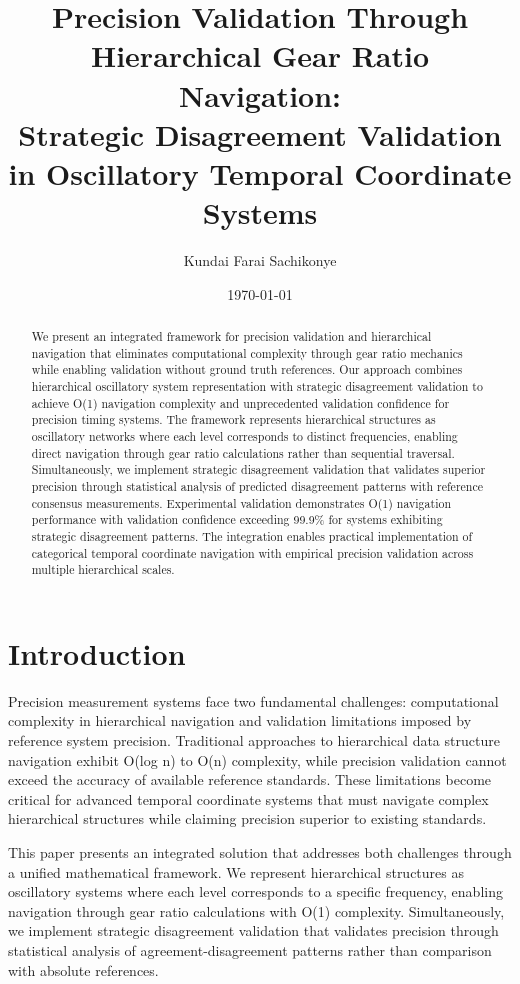 \documentclass[12pt,a4paper]{article}
\title{Precision Validation Through Hierarchical Gear Ratio Navigation: \\
Strategic Disagreement Validation in Oscillatory Temporal Coordinate Systems}
\author{Kundai Farai Sachikonye}
\date{\today}
\begin{document}
\maketitle

\begin{abstract}
We present an integrated framework for precision validation and hierarchical navigation that eliminates computational complexity through gear ratio mechanics while enabling validation without ground truth references. Our approach combines hierarchical oscillatory system representation with strategic disagreement validation to achieve O(1) navigation complexity and unprecedented validation confidence for precision timing systems. The framework represents hierarchical structures as oscillatory networks where each level corresponds to distinct frequencies, enabling direct navigation through gear ratio calculations rather than sequential traversal. Simultaneously, we implement strategic disagreement validation that validates superior precision through statistical analysis of predicted disagreement patterns with reference consensus measurements. Experimental validation demonstrates O(1) navigation performance with validation confidence exceeding 99.9\% for systems exhibiting strategic disagreement patterns. The integration enables practical implementation of categorical temporal coordinate navigation with empirical precision validation across multiple hierarchical scales.
\end{abstract}

\section{Introduction}

Precision measurement systems face two fundamental challenges: computational complexity in hierarchical navigation and validation limitations imposed by reference system precision. Traditional approaches to hierarchical data structure navigation exhibit O(log n) to O(n) complexity, while precision validation cannot exceed the accuracy of available reference standards. These limitations become critical for advanced temporal coordinate systems that must navigate complex hierarchical structures while claiming precision superior to existing standards.

This paper presents an integrated solution that addresses both challenges through a unified mathematical framework. We represent hierarchical structures as oscillatory systems where each level corresponds to a specific frequency, enabling navigation through gear ratio calculations with O(1) complexity. Simultaneously, we implement strategic disagreement validation that validates precision through statistical analysis of agreement-disagreement patterns rather than comparison with absolute references.
\end{document}

